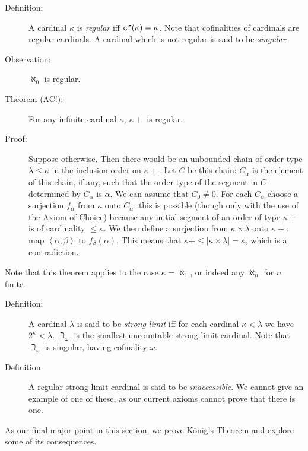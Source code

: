 \documentclass[12pt]{book}
\begin{document}
\begin{description}
\item[Definition:]  A cardinal $\kappa$ is {\em regular} iff ${\tt cf}(\kappa)=\kappa$.  Note that cofinalities of cardinals are regular cardinals.  A cardinal which is not regular is said to be {\em singular\/}.

\item[Observation:]  $\aleph_0$ is regular.

\item[Theorem (AC!):]  For any infinite cardinal $\kappa$, $\kappa+$ is regular.

\item[Proof:]  Suppose otherwise.  Then there would be an unbounded chain of order type $\lambda \leq \kappa$ in the inclusion order on $\kappa+$.  Let $C$ be this chain:
$C_{\alpha}$ is the element of this chain, if any, such that the order type of the segment in $C$ determined by $C_{\alpha}$ is $\alpha$.  We can assume that $C_0 \neq 0$.  For each $C_{\alpha}$ choose
a surjection $f_{\alpha}$ from $\kappa$ onto $C_{\alpha}$:  this is possible (though only with the use of the Axiom of Choice)  because any initial segment of an order of type $\kappa+$ is of cardinality $\leq \kappa$.  We then define
a surjection from $\kappa \times \lambda$ onto $\kappa+$:  map $\left<\alpha,\beta\right>$ to $f_{\beta}(\alpha)$.  This means that $\kappa+\leq |\kappa \times \lambda| = \kappa$, which is a contradiction.



\end{description}

Note that this theorem applies to the case $\kappa=\aleph_1$, or indeed any $\aleph_n$ for $n$ finite.

\begin{description}

\item[Definition:]  A cardinal $\lambda$  is said to be {\em strong limit\/} iff for each cardinal $\kappa<\lambda$ we have $2^{\kappa}<\lambda$.  $\beth_{\omega}$ is the smallest uncountable strong limit cardinal.  Note that $\beth_{\omega}$ is singular, having cofinality $\omega$.

\item[Definition:]  A regular strong limit cardinal is said to be {\em inaccessible\/}.   We cannot give an example of one of these, as our current axioms cannot prove that there is one.

\end{description}

As our final major point in this section, we prove K\"onig's Theorem and explore some of its consequences.
\end{document}
